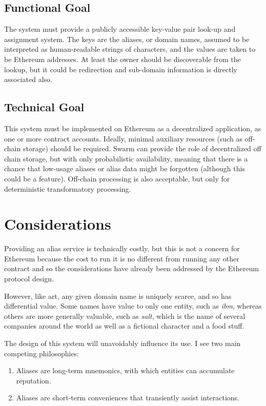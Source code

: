 \documentclass[10pt,a4paper]{article}
\begin{document}
\subsection*{Functional Goal}
The \ambedon system must provide a publicly accessible key-value pair look-up and assignment system. The keys are the aliases, or domain names, assumed to be interpreted as human-readable strings of characters, and the values are taken to be Ethereum addresses. At least the owner should be discoverable from the lookup, but it could be redirection and sub-domain information is directly associated also.

\subsection*{Technical Goal}
This system must be implemented on Ethereum as a decentralized application, \ie as one or more contract accounts. Ideally, minimal auxiliary resources (such as off-chain storage) should be required. Swarm can provide the role of decentralized off chain storage, but with only probabilistic availability, meaning that there is a chance that low-usage aliases or alias data might be forgotten (although this could be a feature). Off-chain processing is also acceptable, but only for deterministic transformatory processing.

\section*{Considerations}

Providing an alias service is technically costly, but this is not a concern for Ethereum because the cost to run it is no different from running any other contract and so the considerations have already been addressed by the Ethereum protocol design.

However, like art, any given domain name is uniquely scarce, and so has differential value. Some names have value to only one entity, such as {\it ibm}, whereas others are more generally valuable, such as {\it salt}, which is the name of several companies around the world as well as a fictional character and a food stuff.

The design of this system will unavoidably influence its use. I see two main competing philosophies:

\begin{enumerate}
\item Aliases are long-term mnemonics, with which entities can accumulate reputation.
\item Aliases are short-term conveniences that transiently assist interactions.
\end{enumerate}
\end{document}
